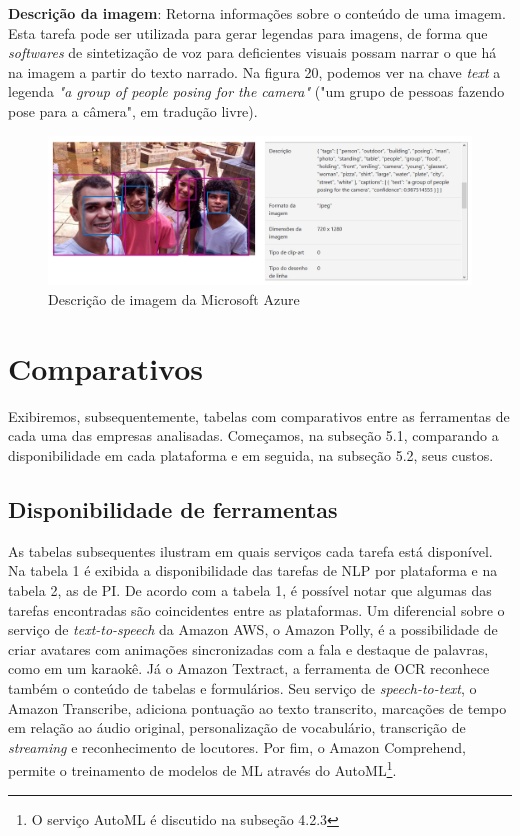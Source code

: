 \documentclass{article}
\begin{document}
\textbf{Descrição da imagem}: Retorna informações sobre o conteúdo de uma imagem. Esta tarefa pode ser utilizada para gerar legendas para imagens, de forma que \textit{softwares} de sintetização de voz para deficientes visuais possam narrar o que há na imagem a partir do texto narrado. Na figura 20, podemos ver na chave \textit{text} a legenda \textit{"a group of people posing for the camera"} ("um grupo de pessoas fazendo pose para a câmera", em tradução livre). \\
\begin{figure}[H]
    \centering
    \includegraphics[scale=0.25]{imagens/caption.png}
    \caption{Descrição de imagem da Microsoft Azure}
    \label{fig:captionalize}
\end{figure}{}

\section{Comparativos}

Exibiremos, subsequentemente, tabelas com comparativos entre as ferramentas de cada uma das empresas analisadas. Começamos, na subseção 5.1, comparando a disponibilidade em cada plataforma e em seguida, na subseção 5.2, seus custos.

\subsection{Disponibilidade de ferramentas}
 As tabelas subsequentes ilustram em quais serviços cada tarefa está disponível. Na tabela 1 é exibida a disponibilidade das tarefas de NLP por plataforma e na tabela 2, as de PI. De acordo com a tabela 1, é possível notar que algumas das tarefas encontradas são coincidentes entre as plataformas. Um diferencial sobre o serviço de \textit{text-to-speech} da Amazon AWS, o Amazon Polly, é a possibilidade de criar avatares com animações sincronizadas com a fala e destaque de palavras, como em um karaokê. Já o Amazon Textract, a ferramenta de OCR reconhece também o conteúdo de tabelas e formulários. Seu serviço de \textit{speech-to-text}, o Amazon Transcribe, adiciona pontuação ao texto transcrito, marcações de tempo em relação ao áudio original, personalização de vocabulário, transcrição de \textit{streaming} e reconhecimento de locutores. Por fim, o Amazon Comprehend, permite o treinamento de modelos de ML através do AutoML\footnote{O serviço AutoML é discutido na subseção 4.2.3}.
 
\end{document}
